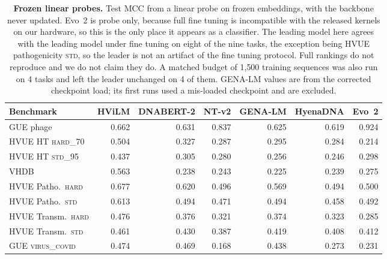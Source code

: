 \begin{table}[h]\centering\small
\caption{\textbf{Frozen linear probes.} Test MCC from a linear probe on frozen embeddings, with the backbone never updated. Evo~2 is probe only, because full fine tuning is incompatible with the released kernels on our hardware, so this is the only place it appears as a classifier. The leading model here agrees with the leading model under fine tuning on eight of the nine tasks, the exception being HVUE pathogenicity \textsc{std}, so the leader is not an artifact of the fine tuning protocol. Full rankings do not reproduce and we do not claim they do. A matched budget of 1{,}500 training sequences was also run on 4 tasks and left the leader unchanged on 4 of them. GENA-LM values are from the corrected checkpoint load; its first runs used a mis-loaded checkpoint and are excluded.}
\begin{tabular}{lrrrrrr}
\toprule
Benchmark & HViLM & DNABERT-2 & NT-v2 & GENA-LM & HyenaDNA & Evo~2 \\
\midrule
GUE phage & 0.662 & 0.631 & 0.837 & 0.625 & 0.619 & 0.924 \\
HVUE HT \textsc{hard\_70} & 0.504 & 0.327 & 0.287 & 0.295 & 0.284 & 0.214 \\
HVUE HT \textsc{std\_95} & 0.437 & 0.305 & 0.280 & 0.256 & 0.246 & 0.298 \\
VHDB & 0.563 & 0.238 & 0.243 & 0.225 & 0.239 & 0.275 \\
HVUE Patho.\ \textsc{hard} & 0.677 & 0.620 & 0.496 & 0.569 & 0.494 & 0.500 \\
HVUE Patho.\ \textsc{std} & 0.613 & 0.494 & 0.471 & 0.494 & 0.458 & 0.492 \\
HVUE Transm.\ \textsc{hard} & 0.476 & 0.376 & 0.321 & 0.374 & 0.323 & 0.285 \\
HVUE Transm.\ \textsc{std} & 0.461 & 0.430 & 0.387 & 0.419 & 0.408 & 0.412 \\
GUE \textsc{virus\_covid} & 0.474 & 0.469 & 0.168 & 0.438 & 0.273 & 0.231 \\
\bottomrule\end{tabular}\end{table}
